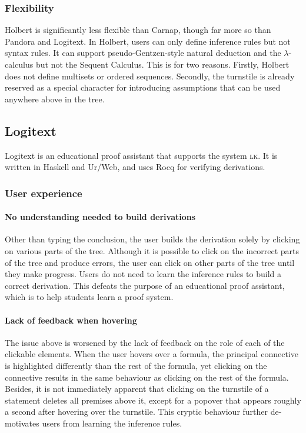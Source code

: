 \subsubsection{Flexibility}
Holbert is significantly less flexible than Carnap, though far more so than Pandora and Logitext. In Holbert, users can only define inference rules but not syntax rules. It can support pseudo-Gentzen-style natural deduction and the $\lambda$-calculus but not the Sequent Calculus. This is for two reasons. Firstly, Holbert does not define multisets or ordered sequences. Secondly, the turnstile is already reserved as a special character for introducing assumptions that can be used anywhere above in the tree.

\subsection{Logitext}
Logitext \cite{yang:2022} is an educational proof assistant that supports the system \textsc{lk}. It is written in Haskell and Ur/Web, and uses Rocq for verifying derivations.
\subsubsection{User experience}
\paragraph{No understanding needed to build derivations}
Other than typing the conclusion, the user builds the derivation solely by clicking on various parts of the tree. Although it is possible to click on the incorrect parts of the tree and produce errors, the user can click on other parts of the tree until they make progress. Users do not need to learn the inference rules to build a correct derivation. This defeats the purpose of an educational proof assistant, which is to help students learn a proof system.

\paragraph{Lack of feedback when hovering}
The issue above is worsened by the lack of feedback on the role of each of the clickable elements. When the user hovers over a formula, the principal connective is highlighted differently than the rest of the formula, yet clicking on the connective results in the same behaviour as clicking on the rest of the formula. Besides, it is not immediately apparent that clicking on the turnstile of a statement deletes all premises above it, except for a popover that appears roughly a second after hovering over the turnstile. This cryptic behaviour further de-motivates users from learning the inference rules.

